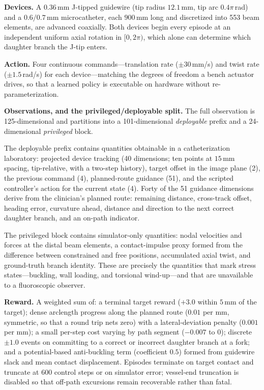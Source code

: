 \textbf{Devices.} A $0.36$\,mm J-tipped guidewire (tip radius $12.1$\,mm, tip arc $0.4\pi$\,rad)
and a $0.6/0.7$\,mm microcatheter, each $900$\,mm long and discretized into 553 beam elements,
are advanced coaxially. Both devices begin every episode at an independent uniform axial
rotation in $[0, 2\pi)$, which alone can determine which daughter branch the J-tip enters.

\textbf{Action.} Four continuous commands---translation rate ($\pm 30$\,mm/s) and twist rate
($\pm 1.5$\,rad/s) for each device---matching the degrees of freedom a bench actuator drives,
so that a learned policy is executable on hardware without re-parameterization.

\textbf{Observations, and the privileged/deployable split.} The full observation is
125-dimensional and partitions into a 101-dimensional \emph{deployable} prefix and a
24-dimensional \emph{privileged} block.

The deployable prefix contains quantities obtainable in a catheterization laboratory:
projected device tracking (40 dimensions; ten points at $15$\,mm spacing, tip-relative, with a
two-step history), target offset in the image plane (2), the previous command (4),
planned-route guidance (51), and the scripted controller's action for the current state (4).
Forty of the 51 guidance dimensions derive from the clinician's planned route: remaining
distance, cross-track offset, heading error, curvature ahead, distance and direction to the
next correct daughter branch, and an on-path indicator.

The privileged block contains simulator-only quantities: nodal velocities and forces at the
distal beam elements, a contact-impulse proxy formed from the difference between constrained
and free positions, accumulated axial twist, and ground-truth branch identity. These are
precisely the quantities that mark stress states---buckling, wall loading, and torsional
wind-up---and that are unavailable to a fluoroscopic observer.

\textbf{Reward.} A weighted sum of: a terminal target reward ($+3.0$ within $5$\,mm of the
target); dense arclength progress along the planned route ($0.01$ per mm, symmetric, so that a
round trip nets zero) with a lateral-deviation penalty ($0.001$ per mm); a small per-step cost
varying by path segment ($-0.007$ to $0$); discrete $\pm 1.0$ events on committing to a correct
or incorrect daughter branch at a fork; and a potential-based anti-buckling term (coefficient
$0.5$) formed from guidewire slack and mean contact displacement. Episodes terminate on target
contact and truncate at 600 control steps or on simulator error; vessel-end truncation is
disabled so that off-path excursions remain recoverable rather than fatal.

